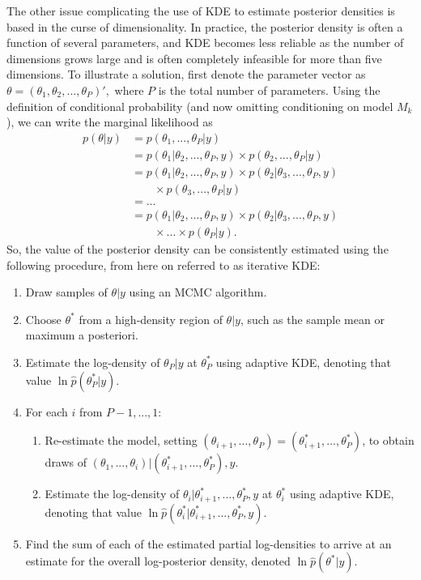 \documentclass[twocolumn]{article}
\begin{document}
The other issue complicating the use of KDE to estimate posterior densities is based in the curse of dimensionality. In practice, the posterior density is often a function of several parameters, and KDE becomes less reliable as the number of dimensions grows large and is often completely infeasible for more than five dimensions. To illustrate a solution, first denote the parameter vector as $\theta = (\theta_1, \theta_2, ..., \theta_P)',$ where $P$ is the total number of parameters. Using the definition of conditional probability (and now omitting conditioning on model $M_k$), we can write the marginal likelihood as
\begin{subequations}
\begin{align}
	p(\theta|y)
	&= p(\theta_1, ..., \theta_P|y) \\
	&= p(\theta_1|\theta_2, ..., \theta_P, y)\times p(\theta_2, ..., \theta_P|y) \\
	&= p(\theta_1|\theta_2, ..., \theta_P, y)\times p(\theta_2|\theta_3, ..., \theta_P, y) \\ &\qquad\times p(\theta_3, ..., \theta_P|y) \\
	&= ... \\
	&= p(\theta_1|\theta_2, ..., \theta_P, y)\times p(\theta_2|\theta_3, ..., \theta_P, y)\\ &\qquad\times ...\times p(\theta_P|y).
\end{align}
\end{subequations}
So, the value of the posterior density can be consistently estimated using the following procedure, from here on referred to as iterative KDE:
\begin{enumerate}[noitemsep]
	\item Draw samples of $\theta|y$ using an MCMC algorithm.
	\item Choose $\theta^*$ from a high-density region of $\theta|y$, such as the sample mean or maximum a posteriori.
	\item Estimate the log-density of $\theta_P|y$ at $\theta_P^*$ using adaptive KDE, denoting that value $\ln \hat{p}(\theta_P^*|y)$.
	\item For each $i$ from $P-1, ..., 1$:
		\begin{enumerate}
			\item Re-estimate the model, setting $(\theta_{i+1}, ..., \theta_P) = (\theta_{i+1}^*, ..., \theta_P^*)$, to obtain draws of $(\theta_1, ..., \theta_i)|(\theta_{i+1}^*, ..., \theta_P^*), y$.
			\item Estimate the log-density of $\theta_i|\theta_{i+1}^*, ..., \theta_P^*, y$ at $\theta_i^*$ using adaptive KDE, denoting that value $\ln \hat{p}(\theta_i^*|\theta_{i+1}^*, ..., \theta_P^*, y)$.
		\end{enumerate}
	\item Find the sum of each of the estimated partial log-densities to arrive at an estimate for the overall log-posterior density, denoted $\ln \hat{p}(\theta^*|y)$.
\end{enumerate}
\end{document}
